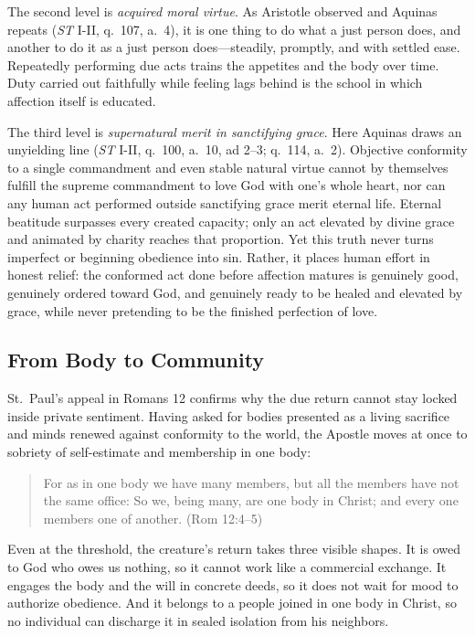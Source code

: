 The second level is \emph{acquired moral virtue}. As Aristotle observed and Aquinas repeats (\emph{ST} I-II, q.\ 107, a.\ 4), it is one thing to do what a just person does, and another to do it as a just person does---steadily, promptly, and with settled ease. Repeatedly performing due acts trains the appetites and the body over time. Duty carried out faithfully while feeling lags behind is the school in which affection itself is educated.

The third level is \emph{supernatural merit in sanctifying grace}. Here Aquinas draws an unyielding line (\emph{ST} I-II, q.\ 100, a.\ 10, ad 2--3; q.\ 114, a.\ 2). Objective conformity to a single commandment and even stable natural virtue cannot by themselves fulfill the supreme commandment to love God with one's whole heart, nor can any human act performed outside sanctifying grace merit eternal life. Eternal beatitude surpasses every created capacity; only an act elevated by divine grace and animated by charity reaches that proportion. Yet this truth never turns imperfect or beginning obedience into sin. Rather, it places human effort in honest relief: the conformed act done before affection matures is genuinely good, genuinely ordered toward God, and genuinely ready to be healed and elevated by grace, while never pretending to be the finished perfection of love.

\subsection{From Body to Community}

St.\ Paul's appeal in Romans 12 confirms why the due return cannot stay locked inside private sentiment. Having asked for bodies presented as a living sacrifice and minds renewed against conformity to the world, the Apostle moves at once to sobriety of self-estimate and membership in one body:

\begin{quote}
For as in one body we have many members, but all the members have not the same office: So we, being many, are one body in Christ; and every one members one of another. (Rom 12:4--5)
\end{quote}

Even at the threshold, the creature's return takes three visible shapes. It is owed to God who owes us nothing, so it cannot work like a commercial exchange. It engages the body and the will in concrete deeds, so it does not wait for mood to authorize obedience. And it belongs to a people joined in one body in Christ, so no individual can discharge it in sealed isolation from his neighbors.
